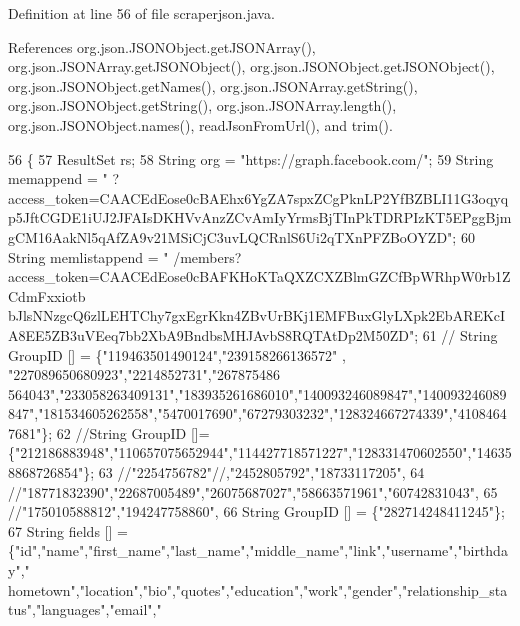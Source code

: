 Definition at line 56 of file scraperjson.\-java.



References org.\-json.\-J\-S\-O\-N\-Object.\-get\-J\-S\-O\-N\-Array(), org.\-json.\-J\-S\-O\-N\-Array.\-get\-J\-S\-O\-N\-Object(), org.\-json.\-J\-S\-O\-N\-Object.\-get\-J\-S\-O\-N\-Object(), org.\-json.\-J\-S\-O\-N\-Object.\-get\-Names(), org.\-json.\-J\-S\-O\-N\-Array.\-get\-String(), org.\-json.\-J\-S\-O\-N\-Object.\-get\-String(), org.\-json.\-J\-S\-O\-N\-Array.\-length(), org.\-json.\-J\-S\-O\-N\-Object.\-names(), read\-Json\-From\-Url(), and trim().


\begin{DoxyCode}
56                                                                                          \{
57       ResultSet rs;
58       String org = \textcolor{stringliteral}{"https://graph.facebook.com/"};
59       String memappend = \textcolor{stringliteral}{"
      ?access\_token=CAACEdEose0cBAEhx6YgZA7spxZCgPknLP2YfBZBLI11G3oqyqp5JftCGDE1iUJ2JFAIsDKHVvAnzZCvAmIyYrmsBjTInPkTDRPIzKT5EPggBjmgCM16AakNl5qAfZA9v21MSiCjC3uvLQCRnlS6Ui2qTXnPFZBoOYZD"};
60       String memlistappend = \textcolor{stringliteral}{"
      /members?access\_token=CAACEdEose0cBAFKHoKTaQXZCXZBlmGZCfBpWRhpW0rb1ZCdmFxxiotb
      bJlsNNzgcQ6zlLEHTChy7gxEgrKkn4ZBvUrBKj1EMFBuxGlyLXpk2EbAREKcIA8EE5ZB3uVEeq7bb2XbA9BndbsMHJAvbS8RQTAtDp2M50ZD"};
61      \textcolor{comment}{// String GroupID [] = \{"119463501490124","239158266136572" ,
       "227089650680923","2214852731","267875486
      564043","233058263409131","183935261686010","140093246089847","140093246089847","181534605262558","5470017690","67279303232","128324667274339","41084647681"\};}
62       \textcolor{comment}{//String GroupID []=
       \{"212186883948","110657075652944","114427718571227","128331470602550","146358868726854"\};}
63       \textcolor{comment}{//"2254756782"//,"2452805792","18733117205",}
64       \textcolor{comment}{//"18771832390","22687005489","26075687027","58663571961","60742831043",}
65       \textcolor{comment}{//"175010588812","194247758860",}
66       String GroupID [] = \{\textcolor{stringliteral}{"282714248411245"}\};
67       String fields [] = \{\textcolor{stringliteral}{"id"},\textcolor{stringliteral}{"name"},\textcolor{stringliteral}{"first\_name"},\textcolor{stringliteral}{"last\_name"},\textcolor{stringliteral}{"middle\_name"},\textcolor{stringliteral}{"link"},\textcolor{stringliteral}{"username"},\textcolor{stringliteral}{"birthday"},\textcolor{stringliteral}{"
      hometown"},\textcolor{stringliteral}{"location"},\textcolor{stringliteral}{"bio"},\textcolor{stringliteral}{"quotes"},\textcolor{stringliteral}{"education"},\textcolor{stringliteral}{"work"},\textcolor{stringliteral}{"gender"},\textcolor{stringliteral}{"relationship\_status"},\textcolor{stringliteral}{"languages"},\textcolor{stringliteral}{"email"},\textcolor{stringliteral}{"
}
\end{DoxyCode}

